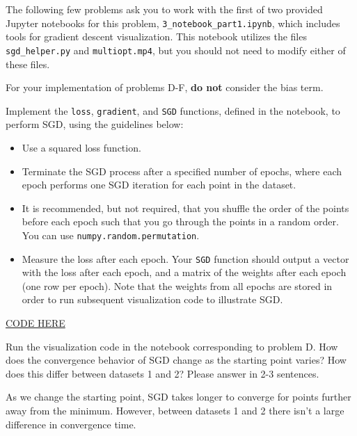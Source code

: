The following few problems ask you to work with the first of two provided Jupyter notebooks for this problem, \texttt{3_notebook_part1.ipynb}, which includes tools for gradient descent visualization. This notebook utilizes the files \texttt{sgd_helper.py} and \texttt{multiopt.mp4}, but you should not need to modify either of these files. 

For your implementation of problems D-F, \textbf{do not} consider the bias term.

\begin{problem}[6]
  Implement the \texttt{loss}, \texttt{gradient}, and \texttt{SGD} functions, defined in the notebook, to perform SGD, using the guidelines below:

  \begin{itemize}
    \item Use a squared loss function.
    \item Terminate the SGD process after a specified number of epochs, where each epoch performs one SGD iteration for each point in the dataset.
    \item It is recommended, but not required, that you shuffle the order of the points before each epoch such that you go through the points in a random order. You can use \texttt{numpy.random.permutation}.
    \item Measure the loss after each epoch. Your \texttt{SGD} function should output a vector with the loss after each epoch, and a matrix of the weights after each epoch (one row per epoch). Note that the weights from all epochs are stored in order to run subsequent visualization code to illustrate SGD.
  \end{itemize}
\end{problem}
\begin{solution}
\href{https://colab.research.google.com/drive/1GFc23TqByol_4OWS_tyVTa3n8eoYXFvn?usp=sharing}{CODE HERE}
\end{solution}

\begin{problem}[2]
  Run the visualization code in the notebook corresponding to problem D. How does the convergence behavior of SGD change as the starting point varies? How does this differ between datasets 1 and 2? Please answer in 2-3 sentences.
\end{problem}
\begin{solution}
As we change the starting point, SGD takes longer to converge for points further away from the minimum. However, between datasets 1 and 2 there isn't a large difference in convergence time.
\end{solution}


